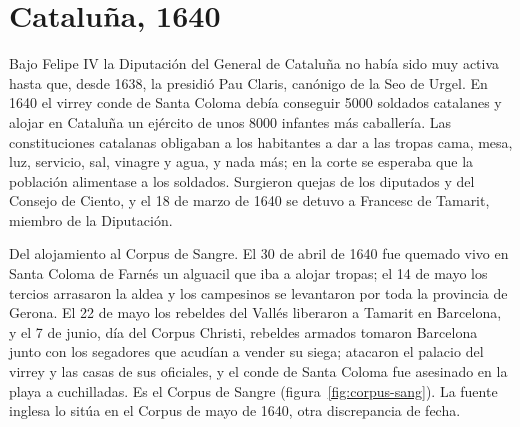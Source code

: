 \documentclass{book}
\begin{document}

\section{Cataluña, 1640}

Bajo Felipe IV la Diputación del General de Cataluña no había sido muy activa hasta que, desde 1638, la presidió Pau Claris, canónigo de la Seo de Urgel. En 1640 el virrey conde de Santa Coloma debía conseguir 5000 soldados catalanes y alojar en Cataluña un ejército de unos 8000 infantes más caballería. Las constituciones catalanas obligaban a los habitantes a dar a las tropas cama, mesa, luz, servicio, sal, vinagre y agua, y nada más; en la corte se esperaba que la población alimentase a los soldados. Surgieron quejas de los diputados y del Consejo de Ciento, y el 18 de marzo de 1640 se detuvo a Francesc de Tamarit, miembro de la Diputación.


Del alojamiento al Corpus de Sangre. El 30 de abril de 1640 fue quemado vivo en Santa Coloma de Farnés un alguacil que iba a alojar tropas; el 14 de mayo los tercios arrasaron la aldea y los campesinos se levantaron por toda la provincia de Gerona. El 22 de mayo los rebeldes del Vallés liberaron a Tamarit en Barcelona, y el 7 de junio, día del Corpus Christi, rebeldes armados tomaron Barcelona junto con los segadores que acudían a vender su siega; atacaron el palacio del virrey y las casas de sus oficiales, y el conde de Santa Coloma fue asesinado en la playa a cuchilladas. Es el Corpus de Sangre (figura~\ref{fig:corpus-sang}). La fuente inglesa lo sitúa en el Corpus de mayo de 1640, otra discrepancia de fecha.

\end{document}
